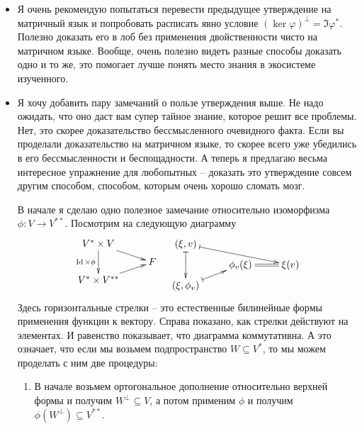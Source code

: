 \begin{itemize}
\item Я очень рекомендую попытаться перевести предыдущее утверждение на матричный язык и попробовать расписать явно условие $(\ker \varphi)^\bot = \Im \varphi^*$.
Полезно доказать его в лоб без применения двойственности чисто на матричном языке.
Вообще, очень полезно видеть разные способы доказать одно и то же, это помогает лучше понять место знания в экосистеме изученного.

\item Я хочу добавить пару замечаний о пользе утверждения выше.
Не надо ожидать, что оно даст вам супер тайное знание, которое решит все проблемы.
Нет, это скорее доказательство бессмысленного очевидного факта.
Если вы проделали доказательство на матричном языке, то скорее всего уже убедились в его бессмысленности и беспощадности.
А теперь я предлагаю весьма интересное упражнение для любопытных -- доказать это утверждение совсем другим способом, способом, которым очень хорошо сломать мозг.

В начале я сделаю одно полезное замечание относительно изоморфизма $\phi\colon V\to V^{**}$.
Посмотрим на следующую диаграмму
\[
\xymatrix@R=5pt{
	{V^*\times V}\ar[dd]_{\Identity\times \phi}\ar[rd]&{}\\
	{}&{F}\\
	{V^*\times V^{**}}\ar[ru]&{}\\
}
\quad
\xymatrix@R=5pt{
	{(\xi, v)}\ar@{|->}[dd]\ar@{|->}[rrd]&{}&{}\\
	{}&{\phi_v(\xi)}\ar@{=}[r]&{\xi(v)}\\
	{(\xi,\phi_v)}\ar@{|->}[ru]&{}&{}\\
}
\]
Здесь горизонтальные стрелки -- это естественные билинейные формы применения функции к вектору.
Справа показано, как стрелки действуют на элементах.
И равенство показывает, что диаграмма коммутативна.
А это означает, что если мы возьмем подпространство $W\subseteq V^*$, то мы можем проделать с ним две процедуры: 
\begin{enumerate}
\item В начале возьмем ортогональное дополнение относительно верхней формы и получим $W^\bot \subseteq V$, а потом применим $\phi$ и получим $\phi(W^\bot)\subseteq V^{**}$.


\end{enumerate}
\end{itemize}
